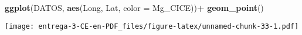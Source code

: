 \documentclass[
]{article}
\newenvironment{Shaded}{\begin{snugshade}}{\end{snugshade}}
\newcommand{\DataTypeTok}[1]{\textcolor[rgb]{0.13,0.29,0.53}{#1}}
\newcommand{\DecValTok}[1]{\textcolor[rgb]{0.00,0.00,0.81}{#1}}
\newcommand{\KeywordTok}[1]{\textcolor[rgb]{0.13,0.29,0.53}{\textbf{#1}}}
\newcommand{\NormalTok}[1]{#1}
\newcommand{\OperatorTok}[1]{\textcolor[rgb]{0.81,0.36,0.00}{\textbf{#1}}}
\newcommand{\StringTok}[1]{\textcolor[rgb]{0.31,0.60,0.02}{#1}}
\begin{document}
\begin{Shaded}
\begin{Highlighting}[]
\KeywordTok{ggplot}\NormalTok{(DATOS, }\KeywordTok{aes}\NormalTok{(Long, Lat, }\DataTypeTok{color =}\NormalTok{ Mg_CICE))}\OperatorTok{+}
\StringTok{  }\KeywordTok{geom_point}\NormalTok{()}
\end{Highlighting}
\end{Shaded}

\texttt{[image: entrega-3-CE-en-PDF\_files/figure-latex/unnamed-chunk-33-1.pdf]}

\begin{Shaded}
\end{Shaded}
\end{document}
